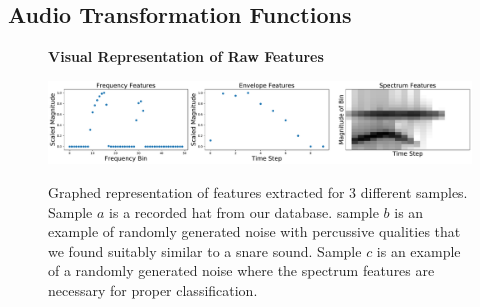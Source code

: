 \documentclass[runningheads,a4paper]{llncs}
\begin{document}
\begin{appendices}

\chapter{Audio Transformation Functions}
\label{appendix:trans_funcitons}
\begin{figure}[tbp]
\centering
\textbf{Visual Representation of Raw Features}\par\medskip
    { \includegraphics[width=1\columnwidth]{images/ff3.pdf}}
\caption{Graphed representation of features extracted for 3 different samples. Sample $a$ is a recorded hat from our database. sample $b$ is an example of randomly generated noise with percussive qualities that we found suitably similar to a snare sound. Sample $c$ is an example of a randomly generated noise where the spectrum features are necessary for proper classification.}

\end{figure}
\end{appendices}
\end{document}
